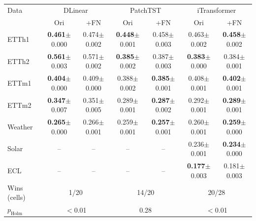 \begin{tabular}{lcccccc}
\toprule
Data & \multicolumn{2}{c}{DLinear} & \multicolumn{2}{c}{PatchTST} & \multicolumn{2}{c}{iTransformer} \\
 & Ori & +FN & Ori & +FN & Ori & +FN \\
\midrule
ETTh1 & \textbf{0.461}\tiny{$\pm$0.000} & 0.474\tiny{$\pm$0.002} & \textbf{0.448}\tiny{$\pm$0.001} & 0.458\tiny{$\pm$0.003} & 0.463\tiny{$\pm$0.002} & \textbf{0.458}\tiny{$\pm$0.002} \\
ETTh2 & \textbf{0.561}\tiny{$\pm$0.003} & 0.571\tiny{$\pm$0.002} & \textbf{0.385}\tiny{$\pm$0.002} & 0.387\tiny{$\pm$0.003} & \textbf{0.383}\tiny{$\pm$0.000} & 0.384\tiny{$\pm$0.001} \\
ETTm1 & \textbf{0.404}\tiny{$\pm$0.000} & 0.409\tiny{$\pm$0.000} & 0.388\tiny{$\pm$0.002} & \textbf{0.385}\tiny{$\pm$0.001} & 0.408\tiny{$\pm$0.001} & \textbf{0.402}\tiny{$\pm$0.001} \\
ETTm2 & \textbf{0.347}\tiny{$\pm$0.007} & 0.351\tiny{$\pm$0.005} & 0.289\tiny{$\pm$0.001} & \textbf{0.287}\tiny{$\pm$0.002} & 0.292\tiny{$\pm$0.001} & \textbf{0.289}\tiny{$\pm$0.001} \\
Weather & \textbf{0.265}\tiny{$\pm$0.000} & 0.266\tiny{$\pm$0.001} & 0.259\tiny{$\pm$0.001} & \textbf{0.257}\tiny{$\pm$0.001} & 0.260\tiny{$\pm$0.001} & \textbf{0.259}\tiny{$\pm$0.000} \\
Solar & -- & -- & -- & -- & 0.236\tiny{$\pm$0.001} & \textbf{0.234}\tiny{$\pm$0.000} \\
ECL & -- & -- & -- & -- & \textbf{0.177}\tiny{$\pm$0.003} & 0.181\tiny{$\pm$0.003} \\
\midrule
Wins (cells) & \multicolumn{2}{c}{1/20} & \multicolumn{2}{c}{14/20} & \multicolumn{2}{c}{20/28} \\
$p_{\mathrm{Holm}}$ & \multicolumn{2}{c}{$<$0.01} & \multicolumn{2}{c}{0.28} & \multicolumn{2}{c}{$<$0.01} \\
\bottomrule
\end{tabular}
